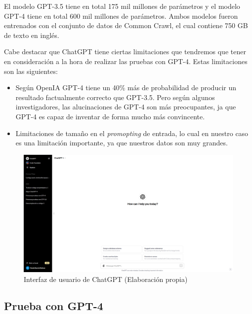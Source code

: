 El modelo GPT-3.5 tiene en total 175 mil millones de parámetros y el modelo GPT-4 tiene
en total 600 mil millones de parámetros. Ambos modelos fueron entrenados con el conjunto
de datos de Common Crawl, el cual contiene 750 GB de texto en inglés.

Cabe destacar que ChatGPT tiene ciertas limitaciones que tendremos que tener en consideración
a la hora de realizar las pruebas con GPT-4. Estas limitaciones son las siguientes:

\begin{itemize}
    \item Según OpenIA GPT-4 tiene un 40\% más de probabilidad de producir un resultado
        factualmente correcto que GPT-3.5. Pero según algunos investigadores, las
        alucinaciones de GPT-4 son más preocupantes, ja que GPT-4 es capaz de inventar
        de forma mucho más convincente.
    \item Limitaciones de tamaño en el \textit{promopting} de entrada, lo cual en nuestro
        caso es una limitación importante, ya que nuestros datos son muy grandes.
\end{itemize}

\begin{figure}[H]
    \begin{center}
      \includegraphics[scale=0.3]{figuras/Capitulo_12/InterfazChatGPT.png}
    \end{center}
    \caption[Interfaz de usuario de ChatGPT]{Interfaz de usuario de ChatGPT (Elaboración propia)}
    \label{fig:interfaz_chatgpt}
\end{figure}

\subsection{Prueba con GPT-4}
\label{subsec:prueba_gpt4}

